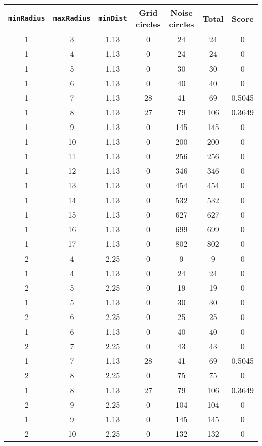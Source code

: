 \documentclass[letterpaper, 12pt]{article}
\begin{document}
\begin{longtable}{|c|c|c|c|c|c|c|}
\hline
\textbf{\texttt{minRadius}} & \textbf{\texttt{maxRadius}} & \textbf{\texttt{minDist}} & \textbf{Grid circles} & \textbf{Noise circles} & \textbf{Total} & \textbf{Score} \\
\hline
1 & 3 & 1.13 & 0 & 24 & 24 & 0 \\
\hline
1 & 4 & 1.13 & 0 & 24 & 24 & 0 \\
\hline
1 & 5 & 1.13 & 0 & 30 & 30 & 0 \\
\hline
1 & 6 & 1.13 & 0 & 40 & 40 & 0 \\
\hline
1 & 7 & 1.13 & 28 & 41 & 69 & 0.5045 \\
\hline
1 & 8 & 1.13 & 27 & 79 & 106 & 0.3649 \\
\hline
1 & 9 & 1.13 & 0 & 145 & 145 & 0 \\
\hline
1 & 10 & 1.13 & 0 & 200 & 200 & 0 \\
\hline
1 & 11 & 1.13 & 0 & 256 & 256 & 0 \\
\hline
1 & 12 & 1.13 & 0 & 346 & 346 & 0 \\
\hline
1 & 13 & 1.13 & 0 & 454 & 454 & 0 \\
\hline
1 & 14 & 1.13 & 0 & 532 & 532 & 0 \\
\hline
1 & 15 & 1.13 & 0 & 627 & 627 & 0 \\
\hline
1 & 16 & 1.13 & 0 & 699 & 699 & 0 \\
\hline
1 & 17 & 1.13 & 0 & 802 & 802 & 0 \\
\hline
2 & 4 & 2.25 & 0 & 9 & 9 & 0 \\
\hline
1 & 4 & 1.13 & 0 & 24 & 24 & 0 \\
\hline
2 & 5 & 2.25 & 0 & 19 & 19 & 0 \\
\hline
1 & 5 & 1.13 & 0 & 30 & 30 & 0 \\
\hline
2 & 6 & 2.25 & 0 & 25 & 25 & 0 \\
\hline
1 & 6 & 1.13 & 0 & 40 & 40 & 0 \\
\hline
2 & 7 & 2.25 & 0 & 43 & 43 & 0 \\
\hline
1 & 7 & 1.13 & 28 & 41 & 69 & 0.5045 \\
\hline
2 & 8 & 2.25 & 0 & 75 & 75 & 0 \\
\hline
1 & 8 & 1.13 & 27 & 79 & 106 & 0.3649 \\
\hline
2 & 9 & 2.25 & 0 & 104 & 104 & 0 \\
\hline
1 & 9 & 1.13 & 0 & 145 & 145 & 0 \\
\hline
2 & 10 & 2.25 & 0 & 132 & 132 & 0 \\

\end{longtable}
\end{document}
